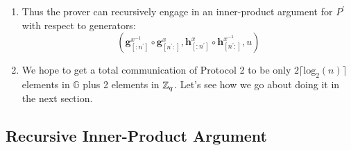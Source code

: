 \begin{enumerate}
    \item Thus the prover can recursively engage in an inner-product argument for $P^{\prime}$ with respect to generators:
    \begin{equation*}
        (\textbf{g}^{x^{-1}}_{[:n^{\prime}]} \circ \textbf{g}^x_{[n^{\prime}:]}, \textbf{h}^x_{[:n^{\prime}]} \circ \textbf{h}^{x^{-1}}_{[n^{\prime}:]},u)
    \end{equation*}

    \item We hope to get a total communication of Protocol 2 to be only $2\lceil \text{log}_2 (n) \rceil$ elements in $\mathbb{G}$ plus 2 elements in $\mathbb{Z}_q$. Let's see how we go about doing it in the next section.
    
\end{enumerate}


\subsection{Recursive Inner-Product Argument}
\label{subsec:iipa/recursion}

